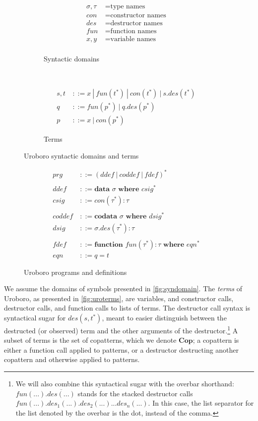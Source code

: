 \begin{figure}
\begin{subfigure}{0.5\textwidth}
\begin{align*}
\sigma, \tau ~&= \textrm{type names}&\\
con ~&= \textrm{constructor names}&\\
des ~&= \textrm{destructor names}&\\
fun ~&= \textrm{function names}&\\
x, y ~&= \textrm{variable names}&\\
\end{align*}
\caption{Syntactic domains}
\label{fig:syndomain}
\end{subfigure}
~
\begin{subfigure}{0.5\textwidth}
\begin{align*}
s, t ~&::= x ~ | ~ fun(t^*) ~ | ~ con(t^*) ~ | ~ s.des(t^*) &\\
q ~&::= fun(p^*) ~ | ~ q.des(p^*) &\\
p ~&::= x ~ | ~ con(p^*) &
\end{align*}
\caption{Terms}
\label{fig:uroterms}
\end{subfigure}
\caption{Uroboro syntactic domains and terms}
\end{figure}

\begin{figure}
\begin{align*}
prg ~&::= (ddef ~ | ~ coddef ~ | ~  fdef)^* &\\
~\\
ddef ~&::= \textbf{data } \sigma \textbf{ where } csig^* &\\
csig ~&::= con(\tau^*): \tau &\\
~\\
coddef ~&::= \textbf{codata } \sigma \textbf{ where } dsig^* &\\
dsig ~&::= \sigma.des(\tau^*): \tau &\\
~\\
fdef ~&::= \textbf{function } fun(\tau^*): \tau \textbf{ where } eqn^* &\\
eqn ~&::= q = t &
\end{align*}
\caption{Uroboro programs and definitions}
\label{fig:uroprogdefs}
\end{figure}

We assume the domains of symbols presented in \autoref{fig:syndomain}. The \textit{terms} of Uroboro, as presented in \autoref{fig:uroterms}, are variables, and constructor calls, destructor calls, and function calls to lists of terms. The destructor call syntax is syntactical sugar for $des(s, t^*)$, meant to easier distinguish between the destructed (or observed) term and the other arguments of the destructor.\footnote{We will also combine this syntactical sugar with the overbar shorthand: $fun(...).\overline{des(...)}$ stands for the stacked destructor calls $fun(...).des_1(...).des_2(...)...des_n(...)$. In this case, the list separator for the list denoted by the overbar is the dot, instead of the comma.} A subset of terms is the set of copatterns, which we denote $\mathbf{Cop}$; a copattern is either a function call applied to patterns, or a destructor destructing another copattern and otherwise applied to patterns.

